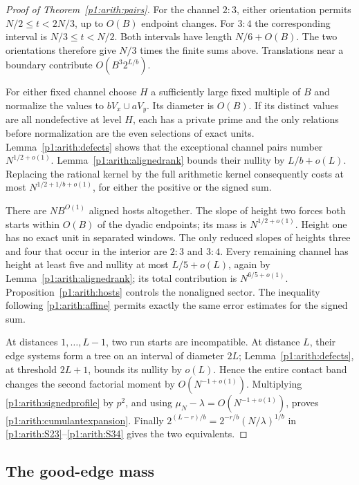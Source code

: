 \begin{proof}[Proof of Theorem~\ref{p1:arith:pairs}]
For the channel $2:3$, either orientation permits
$N/2\leq t<2N/3$, up to $O(B)$ endpoint changes.  For $3:4$ the corresponding
interval is $N/3\leq t<N/2$.  Both intervals have length $N/6+O(B)$.
The two orientations therefore give $N/3$ times the finite sums above.
Translations near a boundary contribute $O(B^3 2^{L/b})$.

For either fixed channel choose $H$ a sufficiently large fixed multiple of
$B$ and normalize the values to $bV_x\cup aV_y$.  Its diameter is $O(B)$.
If its distinct values are all nondefective at level $H$, each has a private
prime and the only relations before normalization are the even selections
of exact units.  Lemma~\ref{p1:arith:defects} shows that the exceptional
channel pairs number $N^{1/2+o(1)}$.  Lemma~\ref{p1:arith:alignedrank} bounds
their nullity by $L/b+o(L)$.  Replacing the rational kernel by the full
arithmetic kernel consequently costs at most
$N^{1/2+1/b+o(1)}$, for either the positive or the signed sum.

There are $N B^{O(1)}$ aligned hosts altogether.  The slope of height two
forces both starts within $O(B)$ of the dyadic endpoints; its mass is
$N^{1/2+o(1)}$.  Height one has no exact unit in separated windows.
The only reduced slopes of heights three and four that occur in the interior
are $2:3$ and $3:4$.  Every remaining channel has height at least five and
nullity at most $L/5+o(L)$, again by Lemma~\ref{p1:arith:alignedrank}; its
total contribution is $N^{6/5+o(1)}$.  Proposition~\ref{p1:arith:hosts}
controls the nonaligned sector.  The inequality following
\eqref{p1:arith:affine} permits exactly the same error estimates for the signed
sum.

At distances $1,\ldots,L-1$, two run starts are incompatible.  At distance
$L$, their edge systems form a tree on an interval of diameter $2L$;
Lemma~\ref{p1:arith:defects}, at threshold $2L+1$, bounds its nullity by
$o(L)$.  Hence the entire contact band changes the second factorial moment
by $O(N^{-1+o(1)})$.  Multiplying \eqref{p1:arith:signedprofile} by $p^2$,
and using $\mu_N-\lambda=O(N^{-1+o(1)})$, proves
\eqref{p1:arith:cumulantexpansion}.  Finally
$2^{(L-r)/b}=2^{-r/b}(N/\lambda)^{1/b}$ in
\eqref{p1:arith:S23}--\eqref{p1:arith:S34} gives the two equivalents.
\end{proof}

\subsection{The good-edge mass}
\label{p14:comp:good-edge-mass}

